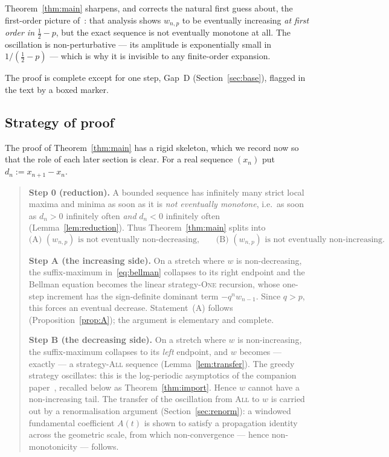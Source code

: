 \documentclass[11pt]{article}
\theoremstyle{definition}
\newcommand{\One}{\textsc{One}}
\newcommand{\All}{\textsc{All}}
\begin{document}
Theorem~\ref{thm:main} sharpens, and corrects the natural first guess
about, the first-order picture of~\cite{Paper1}: that analysis shows
$w_{n,p}$ to be eventually increasing \emph{at first order in}
$\tfrac12-p$, but the exact sequence is not eventually monotone at
all. The oscillation is non-perturbative --- its amplitude is
exponentially small in $1/(\tfrac12-p)$ --- which is why it is
invisible to any finite-order expansion.

The proof is complete except for one step, Gap~D
(Section~\ref{sec:base}), flagged in the text by a boxed marker.

\subsection{Strategy of proof}\label{sec:strategy}

The proof of Theorem~\ref{thm:main} has a rigid skeleton, which we
record now so that the role of each later section is clear. For a real
sequence $(x_n)$ put $d_n:=x_{n+1}-x_n$.

\begin{quote}
\textbf{Step 0 (reduction).} A bounded sequence has infinitely many
strict local maxima and minima as soon as it is \emph{not eventually
monotone}, i.e.\ as soon as $d_n>0$ infinitely often \emph{and}
$d_n<0$ infinitely often (Lemma~\ref{lem:reduction}). Thus
Theorem~\ref{thm:main} splits into
\[
  \text{(A) }(w_{n,p})\text{ is not eventually non-decreasing,}
  \qquad
  \text{(B) }(w_{n,p})\text{ is not eventually non-increasing.}
\]

\textbf{Step A (the increasing side).} On a stretch where $w$ is
non-decreasing, the suffix-maximum in~\eqref{eq:bellman} collapses to
its right endpoint and the Bellman equation becomes the linear
strategy-\One{} recursion, whose one-step increment has the
sign-definite dominant term $-q^{n}w_{n-1}$. Since $q>p$, this forces
an eventual decrease. Statement~(A) follows
(Proposition~\ref{prop:A}); the argument is elementary and complete.

\textbf{Step B (the decreasing side).} On a stretch where $w$ is
non-increasing, the suffix-maximum collapses to its \emph{left}
endpoint, and $w$ becomes --- exactly --- a strategy-\All{} sequence
(Lemma~\ref{lem:transfer}). The greedy strategy oscillates: this is
the log-periodic asymptotics of the companion paper~\cite{Paper2},
recalled below as Theorem~\ref{thm:import}. Hence $w$ cannot have a
non-increasing tail. The transfer of the oscillation from \All{} to
$w$ is carried out by a renormalisation argument
(Section~\ref{sec:renorm}): a windowed fundamental coefficient $A(t)$
is shown to satisfy a propagation identity across the geometric scale,
from which non-convergence --- hence non-monotonicity --- follows.
\end{quote}
\end{document}
